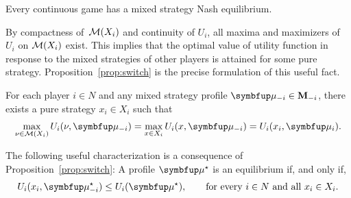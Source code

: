 \begin{theorem}\label{thm:Glick}
    Every continuous game has a mixed strategy Nash equilibrium.
\end{theorem}

By compactness of~$\mathcal{M}(X_i)$ and continuity of $U_i$, all maxima and maximizers of $U_i$ on $\mathcal{M}(X_i)$ exist. This implies that the optimal value of utility function in response to the mixed strategies of other players is attained for some pure strategy. Proposition~\ref{prop:switch} is the precise formulation of this useful fact.

\begin{proposition}\label{prop:switch}
	For each player $i\in N$ and any mixed strategy profile $\bmu_{-i}\in \bM_{-i}$, there exists a pure strategy $x_i\in X_i$ such that
	\[
		\max_{\nu\in \calM(X_i)} U_i(\nu,\bmu_{-i})=\max_{x\in X_i} U_i(x,\bmu_{-i})=U_i(x_i,\bmu_{i}).
	\]
\end{proposition}

The following useful characterization is a consequence of Proposition~\ref{prop:switch}: A profile $\bmu^\star$ is an equilibrium if, and only if,
\[
	U_i(x_i,\bmu_{-i}^\star) \leq U_i(\bmu^\star), \qquad \text{for every $i\in N$ and all $x_i\in X_i$.}
\]
